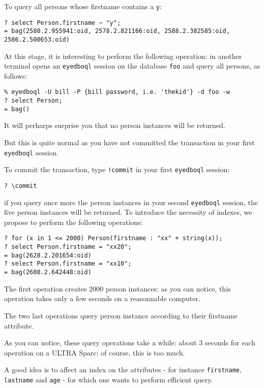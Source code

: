 To query all persons whose firstname contains a \texttt{y}:
\verbsize \begin{verbatim}
? select Person.firstname ~ "y";
= bag(2580.2.955941:oid, 2578.2.821166:oid, 2588.2.382585:oid, 2586.2.500653:oid)
\end{verbatim}
\normalsize

At this stage, it is interesting to perform the following operation:
in another terminal opens an \texttt{eyedboql} session on the database \texttt{foo}
and query all persons, as follows:
\verbsize \begin{verbatim}
% eyedboql -U bill -P {bill password, i.e. 'thekid'} -d foo -w
? select Person;
= bag()
\end{verbatim}
\normalsize
It will perharps surprise you that no person instances will be returned.

But this is quite normal as you have not committed the transaction
in your first \texttt{eyedboql} session.

To commit the transaction, type \texttt{!commit} in your first \texttt{eyedboql}
session:
\verbsize \begin{verbatim}
? \commit
\end{verbatim}
\normalsize
if you query once more the person instances in your second \texttt{eyedboql}
session, the five person instances will be returned.
To introduce the necessity of indexes, we propose to perform the following
operations:
\verbsize \begin{verbatim}
? for (x in 1 <= 2000) Person(firstname : "xx" + string(x));
? select Person.firstname = "xx20";
= bag(2628.2.201654:oid)
? select Person.firstname = "xx10";
= bag(2608.2.642448:oid)
\end{verbatim}
\normalsize
The first operation creates 2000 person instances: as you can notice,
this operation takes only a few seconds on a reasonnable computer.

The two last operations query person instance according to their firstname
attribute.

As you can notice, these query operations take a while: about 3 seconds
for each operation on a ULTRA Sparc: of course, this is too much.


A good idea is to affect an index on the attributes - for instance
\texttt{firstname}, \texttt{lastname} and \texttt{age} - for which one wants
to perform efficient query.



